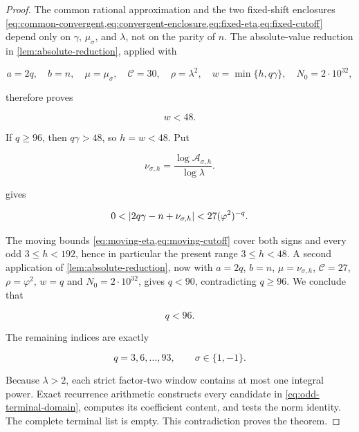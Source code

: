 \begin{proof}
The common rational approximation and the two fixed-shift enclosures
\cref{eq:common-convergent,eq:convergent-enclosure,eq:fixed-eta,eq:fixed-cutoff}
depend only on $\gamma$, $\mu_\sigma$, and $\lambda$, not on the parity of
$n$. The absolute-value reduction in \cref{lem:absolute-reduction}, applied
with

\begin{equation}
 a=2q,\quad b=n,\quad \mu=\mu_\sigma,\quad
 \mathcal C=30,\quad \rho=\lambda^2,\quad
 w=\min\{h,q\gamma\},\quad N_0=2\mathbin{\cdot}10^{32},
\end{equation}

therefore proves

\begin{equation}
 w<48.
 \label{eq:odd-w-48}
\end{equation}

If $q\geqslant96$, then $q\gamma>48$, so $h=w<48$. Put

\begin{equation}
 \nu_{\sigma,h}
 =\frac{\log\mathcal A_{\sigma,h}}{\log\lambda}.
\end{equation}

 gives

\begin{equation}
 0<\lvert2q\gamma-n+\nu_{\sigma,h}\rvert
 <27(\varphi^2)^{-q}.
 \label{eq:odd-moving-reduction}
\end{equation}

The moving bounds \cref{eq:moving-eta,eq:moving-cutoff} cover both
signs and every odd $3\leqslant h<192$, hence in particular the present
range $3\leqslant h<48$. A second application of
\cref{lem:absolute-reduction}, now with $a=2q$, $b=n$,
$\mu=\nu_{\sigma,h}$, $\mathcal C=27$, $\rho=\varphi^2$, $w=q$ and
$N_0=2\mathbin{\cdot}10^{32}$, gives $q<90$, contradicting
$q\geqslant96$. We conclude that

\begin{equation}
 q<96.
 \label{eq:odd-q-96}
\end{equation}

The remaining indices are exactly

\begin{equation}
 q=3,6,\ldots,93,
 \qquad
 \sigma\in\{1,-1\}.
 \label{eq:odd-terminal-domain}
\end{equation}

Because $\lambda>2$, each strict factor-two window contains at most one
integral power. Exact recurrence arithmetic constructs every candidate in
\cref{eq:odd-terminal-domain}, computes its coefficient content, and tests
the norm identity. The complete terminal list is empty. This contradiction
proves the theorem.
\end{proof}

